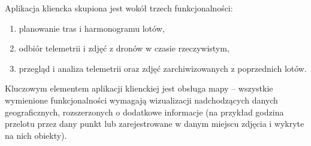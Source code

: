 Aplikacja kliencka skupiona jest wokół trzech funkcjonalności:

\begin{enumerate}
    \item planowanie tras i harmonogramu lotów,
    \item odbiór telemetrii i zdjęć z dronów w czasie rzeczywistym,
    \item przegląd i analiza telemetrii oraz zdjęć zarchiwizowanych z poprzednich lotów.
\end{enumerate}

Kluczowym elementem aplikacji klienckiej jest obsługa mapy -- wszystkie
wymienione funkcjonalności wymagają wizualizacji nadchodzących danych geograficznych,
rozszerzonych o dodatkowe informacje (na przykład godzina przelotu przez dany punkt lub
zarejestrowane w danym miejscu zdjęcia i wykryte na nich obiekty).